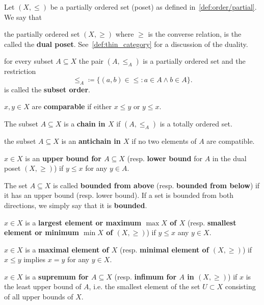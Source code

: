 \begin{definition}\label{def:poset}
  Let \( (X, \leq) \) be a partially ordered set (poset) as defined in~\cref{def:order/partial}. We say that

  \begin{defenum}
     the partially ordered set \( (X, \geq) \) where \( \geq \) is the converse relation, is the called the \textbf{dual poset}. See~\cref{def:thin_category} for a discussion of the duality.

     for every subset \( A \subseteq X \) the pair \( (A, \leq_A) \) is a partially ordered set and the restriction
    \begin{equation*}
      \leq_A \coloneqq \{ (a, b) \in \leq \colon a \in A \land b \in A \}.
    \end{equation*}
    is called the \textbf{subset order}.

     \( x, y \in X \) are \textbf{comparable} if either \( x \leq y \) or \( y \leq x \).

     The subset \( A \subseteq X \) is a \textbf{chain in \( X \)} if \( (A, \leq_A) \) is a totally ordered set.

     the subset \( A \subseteq X \) is an \textbf{antichain in \( X \)} if no two elements of \( A \) are compatible.

    \cite[170]{Enderton1977} \( x \in X \) is an \textbf{upper bound for \( A \subseteq X \)} (resp. \textbf{lower bound} for \( A \) in the dual poset \( (X, \geq) \)) if \( y \leq x \) for any \( y \in A \).

     The set \( A \subseteq X \) is called \textbf{bounded from above} (resp. \textbf{bounded from below}) if it has an upper bound (resp. lower bound). If a set is bounded from both directions, we simply say that it is \textbf{bounded}.

    \cite[171]{Enderton1977} \( x \in X \) is a \textbf{largest element or maximum \( \max X \) of \( X \)} (resp. \textbf{smallest element or minimum \( \min X \) of \( (X, \geq) \)}) if \( y \leq x \) any \( y \in X \).

    \cite[170]{Enderton1977} \( x \in X \) is a \textbf{maximal element of \( X \)} (resp. \textbf{minimal element of \( (X, \geq) \)}) if \( x \leq y \) implies \( x = y \) for any \( y \in X \).

    \cite[170]{Enderton1977} \( x \in X \) is a \textbf{supremum for \( A \subseteq X \)} (resp. \textbf{infimum for \( A \) in \( (X, \geq) \)}) if \( x \) is the least upper bound of \( A \), i.e. the smallest element of the set \( U \subset X \) consisting of all upper bounds of \( X \).
  \end{defenum}
\end{definition}

